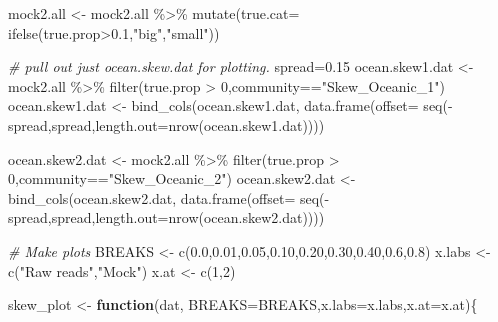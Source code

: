 \documentclass[
]{article}
\newenvironment{Shaded}{\begin{snugshade}}{\end{snugshade}}
\newcommand{\AttributeTok}[1]{\textcolor[rgb]{0.77,0.63,0.00}{#1}}
\newcommand{\CommentTok}[1]{\textcolor[rgb]{0.56,0.35,0.01}{\textit{#1}}}
\newcommand{\ControlFlowTok}[1]{\textcolor[rgb]{0.13,0.29,0.53}{\textbf{#1}}}
\newcommand{\DecValTok}[1]{\textcolor[rgb]{0.00,0.00,0.81}{#1}}
\newcommand{\FloatTok}[1]{\textcolor[rgb]{0.00,0.00,0.81}{#1}}
\newcommand{\FunctionTok}[1]{\textcolor[rgb]{0.00,0.00,0.00}{#1}}
\newcommand{\NormalTok}[1]{#1}
\newcommand{\OtherTok}[1]{\textcolor[rgb]{0.56,0.35,0.01}{#1}}
\newcommand{\SpecialCharTok}[1]{\textcolor[rgb]{0.00,0.00,0.00}{#1}}
\newcommand{\StringTok}[1]{\textcolor[rgb]{0.31,0.60,0.02}{#1}}
\begin{document}
\begin{Shaded}
\begin{Highlighting}[]
\NormalTok{mock2.all }\OtherTok{\textless{}{-}}\NormalTok{ mock2.all }\SpecialCharTok{\%\textgreater{}\%} \FunctionTok{mutate}\NormalTok{(}\AttributeTok{true.cat=} \FunctionTok{ifelse}\NormalTok{(true.prop}\SpecialCharTok{\textgreater{}}\FloatTok{0.1}\NormalTok{,}\StringTok{"big"}\NormalTok{,}\StringTok{"small"}\NormalTok{))}

\CommentTok{\# pull out just ocean.skew.dat for plotting.}
\NormalTok{spread}\OtherTok{=}\FloatTok{0.15}
\NormalTok{ocean.skew1.dat }\OtherTok{\textless{}{-}}\NormalTok{ mock2.all }\SpecialCharTok{\%\textgreater{}\%} 
  \FunctionTok{filter}\NormalTok{(true.prop }\SpecialCharTok{\textgreater{}} \DecValTok{0}\NormalTok{,community}\SpecialCharTok{==}\StringTok{"Skew\_Oceanic\_1"}\NormalTok{)}
\NormalTok{ocean.skew1.dat }\OtherTok{\textless{}{-}} \FunctionTok{bind\_cols}\NormalTok{(ocean.skew1.dat, }
                             \FunctionTok{data.frame}\NormalTok{(}\AttributeTok{offset=}     \FunctionTok{seq}\NormalTok{(}\SpecialCharTok{{-}}\NormalTok{spread,spread,}\AttributeTok{length.out=}\FunctionTok{nrow}\NormalTok{(ocean.skew1.dat))))}

\NormalTok{ocean.skew2.dat }\OtherTok{\textless{}{-}}\NormalTok{ mock2.all }\SpecialCharTok{\%\textgreater{}\%} 
  \FunctionTok{filter}\NormalTok{(true.prop }\SpecialCharTok{\textgreater{}} \DecValTok{0}\NormalTok{,community}\SpecialCharTok{==}\StringTok{"Skew\_Oceanic\_2"}\NormalTok{)}
\NormalTok{ocean.skew2.dat }\OtherTok{\textless{}{-}} \FunctionTok{bind\_cols}\NormalTok{(ocean.skew2.dat, }
                            \FunctionTok{data.frame}\NormalTok{(}\AttributeTok{offset=} \FunctionTok{seq}\NormalTok{(}\SpecialCharTok{{-}}\NormalTok{spread,spread,}\AttributeTok{length.out=}\FunctionTok{nrow}\NormalTok{(ocean.skew2.dat))))}

\CommentTok{\# Make plots}
\NormalTok{BREAKS }\OtherTok{\textless{}{-}} \FunctionTok{c}\NormalTok{(}\FloatTok{0.0}\NormalTok{,}\FloatTok{0.01}\NormalTok{,}\FloatTok{0.05}\NormalTok{,}\FloatTok{0.10}\NormalTok{,}\FloatTok{0.20}\NormalTok{,}\FloatTok{0.30}\NormalTok{,}\FloatTok{0.40}\NormalTok{,}\FloatTok{0.6}\NormalTok{,}\FloatTok{0.8}\NormalTok{)}
\NormalTok{x.labs }\OtherTok{\textless{}{-}} \FunctionTok{c}\NormalTok{(}\StringTok{"Raw reads"}\NormalTok{,}\StringTok{"Mock"}\NormalTok{)}
\NormalTok{x.at   }\OtherTok{\textless{}{-}} \FunctionTok{c}\NormalTok{(}\DecValTok{1}\NormalTok{,}\DecValTok{2}\NormalTok{)}

\NormalTok{skew\_plot }\OtherTok{\textless{}{-}} \ControlFlowTok{function}\NormalTok{(dat,}
                      \AttributeTok{BREAKS=}\NormalTok{BREAKS,}\AttributeTok{x.labs=}\NormalTok{x.labs,}\AttributeTok{x.at=}\NormalTok{x.at)\{}
  

\end{Highlighting}
\end{Shaded}
\end{document}
